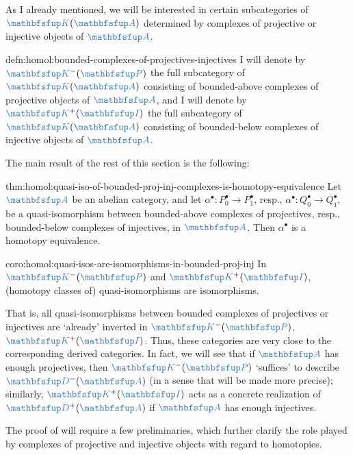 As I already mentioned, we will be interested in certain subcategories
of $\categ{K}(\categ{A})$ determined by complexes of projective or
injective objects of $\categ{A}$.

\begin{defn}{}{defn:homol:bounded-complexes-of-projectives-injectives}
  I will denote by $\categ{K}^-(\categ{P})$ the full subcategory of
  $\categ{K}(\categ{A})$ consisting of bounded-above complexes of
  projective objects of $\categ{A}$, and I will denote by
  $\categ{K}^+(\categ{I})$ the full subcategory of
  $\categ{K}(\categ{A})$ consisting of bounded-below complexes of
  injective objects of $\categ{A}$.
\end{defn}

The main result of the rest of this section is the following:

\begin{thm}{}{thm:homol:quasi-iso-of-bounded-proj-inj-complexes-is-homotopy-equivalence}
  Let $\categ{A}$ be an abelian category, and let
  $\alpha^\bullet : P_0^\bullet \to P_1^\bullet$, resp.,
  $\alpha^\bullet : Q_0^\bullet \to Q_1^\bullet$, be a
  quasi-isomorphism between bounded-above complexes of projectives,
  resp., bounded-below complexes of injectives, in $\categ{A}$. Then
  $\alpha^\bullet$ is a homotopy equivalence.
\end{thm}

\begin{coro}{}{coro:homol:quasi-isos-are-isomorphisms-in-bounded-proj-inj}
  In $\categ{K}^-(\categ{P})$ and $\categ{K}^+(\categ{I})$, (homotopy
  classes of) quasi-isomorphisms are isomorphisms.
\end{coro}

That is, all quasi-isomorphisms between bounded complexes of
projectives or injectives are `already' inverted in
$\categ{K}^-(\categ{P})$, $\categ{K}^+(\categ{I})$. Thus, these
categories are very close to the corresponding derived categories.  In
fact, we will see that if $\categ{A}$ has enough projectives, then
$\categ{K}^-(\categ{P})$ `suffices' to describe
$\categ{D}^-(\categ{A})$ (in a sense that will be made more precise);
similarly, $\categ{K}^+(\categ{I})$ acts as a concrete realization of
$\categ{D}^+(\categ{A})$ if $\categ{A}$ has enough injectives.

The proof of  will require a few
preliminaries, which further clarify the role played by complexes of
projective and injective objects with regard to homotopies.

